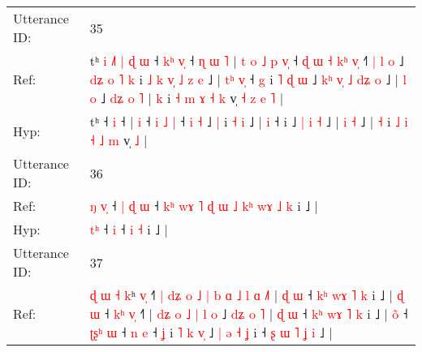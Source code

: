 \documentclass[10pt]{article}
\DeclareRobustCommand{\hl}[1]{{\textcolor{red}{#1}}}
\begin{document}
\begin{longtable}{ll}
\midrule
Utterance ID: & 35 \\
Ref: & tʰ\hl{ }\hl{i}\hl{ }\hl{˩}\hl{˥}\hl{ }\hl{|}\hl{ }\hl{ɖ}\hl{ }\hl{ɯ} ˧\hl{ }\hl{k}\hl{ʰ} \hl{v}\hl{̩} ˧\hl{ }\hl{ɳ}\hl{ }\hl{ɯ}\hl{ }\hl{˥} |\hl{ }\hl{t}\hl{ }\hl{o}\hl{ }\hl{˩}\hl{ }\hl{p} \hl{v}\hl{̩} ˧\hl{ }\hl{ɖ}\hl{ }\hl{ɯ} \hl{˧} \hl{k}\hl{ʰ} \hl{v}\hl{̩} ˧\hl{˥}\hl{ }\hl{|} \hl{l} \hl{o} ˩\hl{ }\hl{d}\hl{ʑ}\hl{ }\hl{o}\hl{ }\hl{˥} \hl{k} i\hl{ }\hl{˩}\hl{ }\hl{k}\hl{ }\hl{v}\hl{̩}\hl{ }\hl{˩} \hl{z} \hl{e} ˩ |\hl{ }\hl{t}\hl{ʰ} \hl{v}\hl{̩} ˧\hl{ }\hl{g} i\hl{ }\hl{˥}\hl{ }\hl{ɖ}\hl{ }\hl{ɯ} ˩\hl{ }\hl{k}\hl{ʰ}\hl{ }\hl{v}\hl{̩} \hl{˩} \hl{d}\hl{ʑ} \hl{o} ˩ | \hl{l} \hl{o} ˩\hl{ }\hl{d}\hl{ʑ}\hl{ }\hl{o}\hl{ }\hl{˥} | \hl{k} i \hl{˧} \hl{m} \hl{ɤ} \hl{˧} \hl{k} v̩\hl{ }\hl{˧}\hl{ }\hl{z}\hl{ }\hl{e} \hl{˥} |
 \\
Hyp: & tʰ\hl{}\hl{}\hl{}\hl{}\hl{}\hl{}\hl{}\hl{}\hl{}\hl{}\hl{} ˧\hl{}\hl{}\hl{} \hl{}\hl{i} ˧\hl{}\hl{}\hl{}\hl{}\hl{}\hl{} |\hl{}\hl{}\hl{}\hl{}\hl{}\hl{}\hl{}\hl{} \hl{}\hl{i} ˧\hl{}\hl{}\hl{}\hl{} \hl{i} \hl{}\hl{˩} \hl{}\hl{|} ˧\hl{}\hl{}\hl{} \hl{i} \hl{˧} ˩\hl{}\hl{}\hl{}\hl{}\hl{}\hl{}\hl{} \hl{|} i\hl{}\hl{}\hl{}\hl{}\hl{}\hl{}\hl{}\hl{}\hl{} \hl{˧} \hl{i} ˩ |\hl{}\hl{}\hl{} \hl{}\hl{i} ˧\hl{}\hl{} i\hl{}\hl{}\hl{}\hl{}\hl{}\hl{} ˩\hl{}\hl{}\hl{}\hl{}\hl{}\hl{} \hl{|} \hl{}\hl{i} \hl{˧} ˩ | \hl{i} \hl{˧} ˩\hl{}\hl{}\hl{}\hl{}\hl{}\hl{}\hl{} | \hl{˧} i \hl{˩} \hl{i} \hl{˧} \hl{˩} \hl{m} v̩\hl{}\hl{}\hl{}\hl{}\hl{}\hl{} \hl{˩} |
 \\
\midrule
Utterance ID: & 36 \\
Ref: & \hl{ŋ}\hl{ }\hl{v}\hl{̩} ˧\hl{ }\hl{|}\hl{ }\hl{ɖ} \hl{ɯ} ˧\hl{ }\hl{k}\hl{ʰ}\hl{ }\hl{w}\hl{ɤ}\hl{ }\hl{˥}\hl{ }\hl{ɖ}\hl{ }\hl{ɯ}\hl{ }\hl{˩}\hl{ }\hl{k}\hl{ʰ}\hl{ }\hl{w}\hl{ɤ} \hl{˩} \hl{k} i ˩ |
 \\
Hyp: & \hl{}\hl{}\hl{t}\hl{ʰ} ˧\hl{}\hl{}\hl{}\hl{} \hl{i} ˧\hl{}\hl{}\hl{}\hl{}\hl{}\hl{}\hl{}\hl{}\hl{}\hl{}\hl{}\hl{}\hl{}\hl{}\hl{}\hl{}\hl{}\hl{}\hl{}\hl{} \hl{i} \hl{˧} i ˩ |
 \\
\midrule
Utterance ID: & 37 \\
Ref: & \hl{ɖ}\hl{ }\hl{ɯ}\hl{ }\hl{˧}\hl{ }\hl{k}ʰ \hl{v}\hl{̩} ˧\hl{˥}\hl{ }\hl{|}\hl{ }\hl{d}\hl{ʑ}\hl{ }\hl{o}\hl{ }\hl{˩}\hl{ }\hl{|}\hl{ }\hl{b}\hl{ }\hl{ɑ}\hl{ }\hl{˩}\hl{ }\hl{l}\hl{ }\hl{ɑ}\hl{ }\hl{˩}\hl{˥} |\hl{ }\hl{ɖ} \hl{ɯ} ˧\hl{ }\hl{k}\hl{ʰ}\hl{ }\hl{w}\hl{ɤ}\hl{ }\hl{˥}\hl{ }\hl{k} i ˩ |\hl{ }\hl{ɖ}\hl{ }\hl{ɯ} ˧\hl{ }\hl{k}\hl{ʰ} \hl{v}\hl{̩} ˧\hl{˥} |\hl{ }\hl{d}\hl{ʑ}\hl{ }\hl{o}\hl{ }\hl{˩} \hl{|} \hl{l} \hl{o} ˩\hl{ }\hl{d}\hl{ʑ}\hl{ }\hl{o}\hl{ }\hl{˥} |\hl{ }\hl{ɖ} \hl{ɯ} ˧\hl{ }\hl{k}\hl{ʰ}\hl{ }\hl{w}\hl{ɤ}\hl{ }\hl{˥}\hl{ }\hl{k} i ˩ | \hl{o}\hl{̃} ˧ \hl{ʈ}\hl{ʂ}\hl{ʰ} \hl{ɯ} ˧ \hl{n} \hl{e} ˧\hl{ }\hl{ʝ} i\hl{ }\hl{˥}\hl{ }\hl{k}\hl{ }\hl{v}\hl{̩} ˩\hl{ }\hl{|}\hl{ }\hl{ə}\hl{ }\hl{˧}\hl{ }\hl{ʝ} i ˧\hl{ }\hl{ʂ}\hl{ }\hl{ɯ} \hl{˥} \hl{ʝ}\hl{ }\hl{i} ˩ |

\end{longtable}
\end{document}
